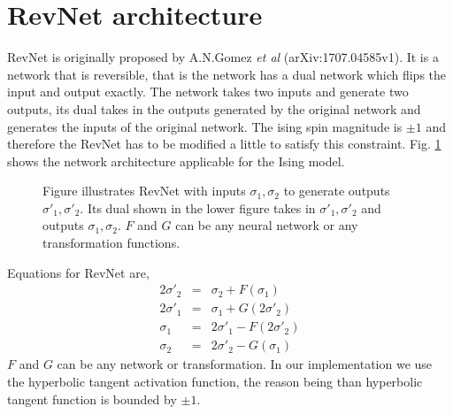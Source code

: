\documentclass{article}
\begin{document}
\section{RevNet architecture}
RevNet is originally proposed by A.N.Gomez {\it et al} (arXiv:1707.04585v1).
It is a network that is reversible, that is the network has a dual network
which flips the input and output exactly. The network takes two inputs and
generate two outputs, its dual takes in the outputs generated by the original 
network and generates the inputs of the original network.
The ising spin magnitude is $\pm 1$ and therefore the RevNet has to be
modified a little to satisfy this constraint. Fig. \ref{fig:revnet} shows 
the network architecture applicable for the Ising model.
%
\begin{figure}
\caption{Figure illustrates RevNet with inputs $\sigma_1,\sigma_2$ to generate
outputs $\sigma'_1,\sigma'_2$. Its dual shown in the lower figure takes 
in $\sigma'_1,\sigma'_2$
and outputs $\sigma_1,\sigma_2$. 
$F$ and $G$ can be any neural network or any 
transformation functions.}
\label{fig:revnet}
\end{figure}
%
Equations for RevNet are,
\begin{eqnarray} 
2 \sigma'_2 & = &  \sigma_2 + F(\sigma_1)  \\ \nonumber
2 \sigma'_1 & = &  \sigma_1 + G(2 \sigma'_2)  \\ \nonumber
\sigma_1 & = & 2 \sigma'_1 - F(2 \sigma'_2) \\ \nonumber
\sigma_2 & = & 2 \sigma'_2 - G(\sigma_1) 
\end{eqnarray}
$F$ and $G$ can be any network or transformation. In our implementation
we use the hyperbolic tangent activation function, the reason being than
hyperbolic tangent function is bounded by $\pm 1$. 
\end{document}

